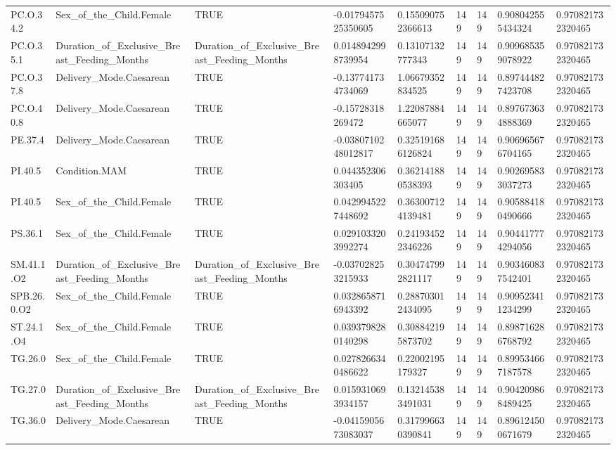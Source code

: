 \begin{longtable}{lllllllll}
PC.O.34.2 & Sex\_of\_the\_Child.Female & TRUE & -0.0179457525350605 & 0.155090752366613 & 149 & 149 & 0.908042555434324 & 0.970821732320465 \\
PC.O.35.1 & Duration\_of\_Exclusive\_Breast\_Feeding\_Months & Duration\_of\_Exclusive\_Breast\_Feeding\_Months & 0.0148942998739954 & 0.13107132777343 & 149 & 149 & 0.909685359078922 & 0.970821732320465 \\
PC.O.37.8 & Delivery\_Mode.Caesarean & TRUE & -0.137741734734069 & 1.06679352834525 & 149 & 149 & 0.897444827423708 & 0.970821732320465 \\
PC.O.40.8 & Delivery\_Mode.Caesarean & TRUE & -0.15728318269472 & 1.22087884665077 & 149 & 149 & 0.897673634888369 & 0.970821732320465 \\
PE.37.4 & Delivery\_Mode.Caesarean & TRUE & -0.0380710248012817 & 0.325191686126824 & 149 & 149 & 0.906965676704165 & 0.970821732320465 \\
PI.40.5 & Condition.MAM & TRUE & 0.044352306303405 & 0.362141880538393 & 149 & 149 & 0.902695833037273 & 0.970821732320465 \\
PI.40.5 & Sex\_of\_the\_Child.Female & TRUE & 0.0429945227448692 & 0.363007124139481 & 149 & 149 & 0.905884180490666 & 0.970821732320465 \\
PS.36.1 & Sex\_of\_the\_Child.Female & TRUE & 0.0291033203992274 & 0.241934522346226 & 149 & 149 & 0.904417774294056 & 0.970821732320465 \\
SM.41.1.O2 & Duration\_of\_Exclusive\_Breast\_Feeding\_Months & Duration\_of\_Exclusive\_Breast\_Feeding\_Months & -0.037028253215933 & 0.304747992821117 & 149 & 149 & 0.903460837542401 & 0.970821732320465 \\
SPB.26.0.O2 & Sex\_of\_the\_Child.Female & TRUE & 0.0328658716943392 & 0.288703012434095 & 149 & 149 & 0.909523411234299 & 0.970821732320465 \\
ST.24.1.O4 & Sex\_of\_the\_Child.Female & TRUE & 0.0393798280140298 & 0.308842195873702 & 149 & 149 & 0.898716286768792 & 0.970821732320465 \\
TG.26.0 & Sex\_of\_the\_Child.Female & TRUE & 0.0278266340486622 & 0.22002195179327 & 149 & 149 & 0.899534667187578 & 0.970821732320465 \\
TG.27.0 & Duration\_of\_Exclusive\_Breast\_Feeding\_Months & Duration\_of\_Exclusive\_Breast\_Feeding\_Months & 0.0159310693934157 & 0.132145383491031 & 149 & 149 & 0.904209868489425 & 0.970821732320465 \\
TG.36.0 & Delivery\_Mode.Caesarean & TRUE & -0.0415905673083037 & 0.317996630390841 & 149 & 149 & 0.896124500671679 & 0.970821732320465 \\

\end{longtable}
